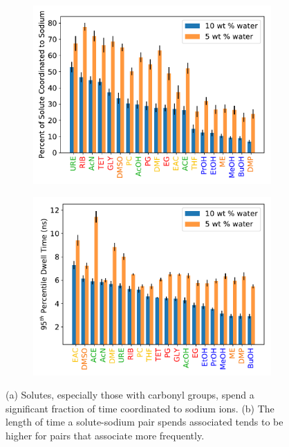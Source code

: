 \documentclass{article}
\begin{document}
  \begin{figure}
  \centering
  \begin{subfigure}{0.49\linewidth}
  \includegraphics[width=\linewidth]{all_solutes_NA_coordination.pdf}
  \caption{}\label{fig:all_solutes_NA_coordination}
  \end{subfigure}
  \begin{subfigure}{0.49\linewidth}
  \includegraphics[width=\linewidth]{all_NA_dwells.pdf}
  \caption{}\label{fig:all_NA_dwells}
  \end{subfigure}
  \caption{(a) Solutes, especially those with carbonyl groups, spend a
  significant fraction of time coordinated to sodium ions. (b) The length
  of time a solute-sodium pair spends associated tends to be higher for
  pairs that associate more frequently.}\label{fig:na_coordination}
  \vspace{-0.5cm}
  \end{figure}
  
\end{document}
